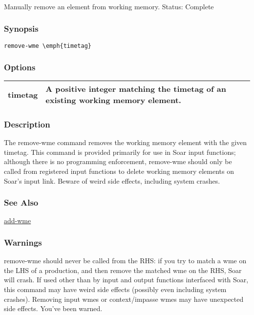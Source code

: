 \subsection{}
\label{remove-wme}
Manually remove an element from working memory. 
 Status: Complete
\subsubsection*{Synopsis}
\begin{verbatim}
remove-wme \emph{timetag}
\end{verbatim}
\subsubsection*{Options}
\begin{tabular}{|l|l|}
\hline 
 timetag  & A positive integer matching the timetag of an existing working memory element.  \\
 \hline 
\end{tabular}
\subsubsection*{Description}
 The remove-wme command removes the working memory element with the given timetag. This command is provided primarily for use in Soar input functions; although there is no programming enforcement, remove-wme should only be called from registered input functions to delete working memory elements on Soar's input link. 
 Beware of weird side effects, including system crashes. 
\subsubsection*{See Also}
\hyperref[add-wme]{add-wme} \subsubsection*{Warnings}
 remove-wme should never be called from the RHS: if you try to match a wme on the LHS of a production, and then remove the matched wme on the RHS, Soar will crash. 
 If used other than by input and output functions interfaced with Soar, this command may have weird side effects (possibly even including system crashes). Removing input wmes or context/impasse wmes may have unexpected side effects. You've been warned. 
